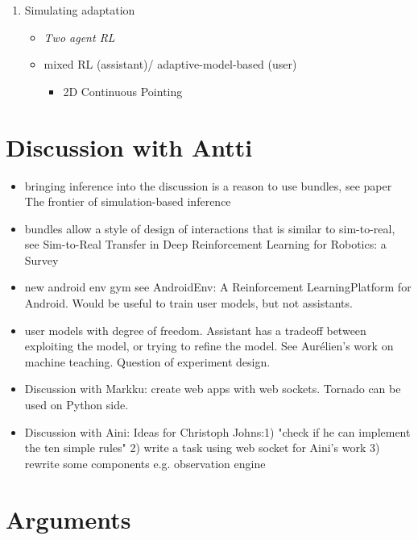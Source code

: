 \documentclass[12pt,a4paper]{article}
\begin{document}
\begin{enumerate}
\item Simulating adaptation 
	\begin{itemize}
	\item \textit{Two agent RL}
	\item mixed RL (assistant)/ adaptive-model-based (user)
		\begin{itemize}
		\item 2D Continuous Pointing
		\end{itemize}
	\end{itemize}
\end{enumerate}

\section{Discussion with Antti}
\begin{itemize}
\item bringing inference into the discussion is a reason to use bundles, see paper The frontier of simulation-based inference
\item bundles allow a style of design of interactions that is similar to sim-to-real, see Sim-to-Real Transfer in Deep Reinforcement Learning for Robotics: a Survey
\item new android env gym see AndroidEnv: A Reinforcement LearningPlatform for Android. Would be useful to train user models, but not assistants.
\item user models with degree of freedom. Assistant has a tradeoff between exploiting the model, or trying to refine the model. See Aurélien's work on machine teaching. Question of experiment design.
\item Discussion with Markku: create web apps with web sockets. Tornado can be used on Python side.
\item Discussion with Aini: Ideas for Christoph Johns:1) "check if he can implement the ten simple rules" 2) write a task using web socket for Aini's work 3) rewrite some components e.g. observation engine
\end{itemize}

\section{Arguments}
\end{document}
